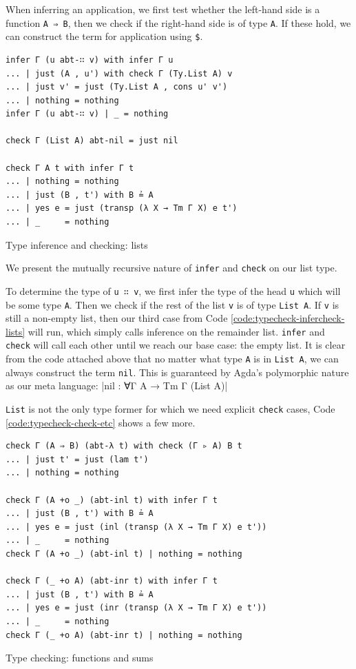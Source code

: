 When inferring an application, we first test whether the left-hand side is a function \verb$A ⇒ B$, then we check if the right-hand side is of type \verb$A$. If these hold, we can construct the term for application using \verb$$\verb=$=\verb$$.

\begin{listing}[H]
\begin{verbatim}
infer Γ (u abt-∷ v) with infer Γ u
... | just (A , u') with check Γ (Ty.List A) v
... | just v' = just (Ty.List A , cons u' v')
... | nothing = nothing
infer Γ (u abt-∷ v) | _ = nothing

check Γ (List A) abt-nil = just nil

check Γ A t with infer Γ t
... | nothing = nothing
... | just (B , t') with B ≟ A
... | yes e = just (transp (λ X → Tm Γ X) e t')
... | _     = nothing
\end{verbatim}
\caption{Type inference and checking: lists}
\label{code:typecheck-infercheck-lists}
\end{listing}

We present the mutually recursive nature of \verb$infer$ and \verb$check$ on our list type.

To determine the type of \verb$u ∷ v$, we first infer the type of the head \verb$u$ which will be some type \verb$A$. Then we check if the rest of the list \verb$v$ is of type \verb$List A$. If \verb$v$ is still a non-empty list, then our third case from Code \ref{code:typecheck-infercheck-lists} will run, which simply calls inference on the remainder list. \verb$infer$ and \verb$check$ will call each other until we reach our base case: the empty list. It is clear from the code attached above that no matter what type \verb$A$ is in \verb$List A$, we can always construct the term \verb$nil$. This is guaranteed by Agda's polymorphic nature as our meta language:
|nil : ∀{Γ A} → Tm Γ (List A)|

\verb$List$ is not the only type former for which we need explicit \verb$check$ cases, Code \ref{code:typecheck-check-etc} shows a few more.

\begin{listing}[H]
\begin{verbatim}
check Γ (A ⇒ B) (abt-λ t) with check (Γ ▹ A) B t
... | just t' = just (lam t')
... | nothing = nothing

check Γ (A +o _) (abt-inl t) with infer Γ t
... | just (B , t') with B ≟ A
... | yes e = just (inl (transp (λ X → Tm Γ X) e t'))
... | _     = nothing
check Γ (A +o _) (abt-inl t) | nothing = nothing

check Γ (_ +o A) (abt-inr t) with infer Γ t
... | just (B , t') with B ≟ A
... | yes e = just (inr (transp (λ X → Tm Γ X) e t'))
... | _     = nothing
check Γ (_ +o A) (abt-inr t) | nothing = nothing
\end{verbatim}
\caption{Type checking: functions and sums}
\label{code:typecheck-check-etc}
\end{listing}

